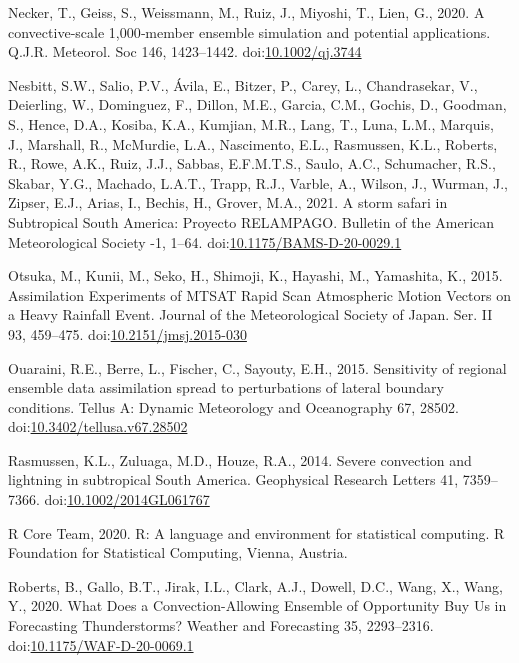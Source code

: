 \documentclass[authoryear,preprint,review,12pt]{elsarticle} %
\begin{document}
\leavevmode\hypertarget{ref-necker2020}{}%
Necker, T., Geiss, S., Weissmann, M., Ruiz, J., Miyoshi, T., Lien, G., 2020. A convective‐scale 1,000‐member ensemble simulation and potential applications. Q.J.R. Meteorol. Soc 146, 1423--1442. doi:\href{https://doi.org/10.1002/qj.3744}{10.1002/qj.3744}

\leavevmode\hypertarget{ref-nesbitt2021}{}%
Nesbitt, S.W., Salio, P.V., Ávila, E., Bitzer, P., Carey, L., Chandrasekar, V., Deierling, W., Dominguez, F., Dillon, M.E., Garcia, C.M., Gochis, D., Goodman, S., Hence, D.A., Kosiba, K.A., Kumjian, M.R., Lang, T., Luna, L.M., Marquis, J., Marshall, R., McMurdie, L.A., Nascimento, E.L., Rasmussen, K.L., Roberts, R., Rowe, A.K., Ruiz, J.J., Sabbas, E.F.M.T.S., Saulo, A.C., Schumacher, R.S., Skabar, Y.G., Machado, L.A.T., Trapp, R.J., Varble, A., Wilson, J., Wurman, J., Zipser, E.J., Arias, I., Bechis, H., Grover, M.A., 2021. A storm safari in Subtropical South America: Proyecto RELAMPAGO. Bulletin of the American Meteorological Society -1, 1--64. doi:\href{https://doi.org/10.1175/BAMS-D-20-0029.1}{10.1175/BAMS-D-20-0029.1}

\leavevmode\hypertarget{ref-otsuka2015}{}%
Otsuka, M., Kunii, M., Seko, H., Shimoji, K., Hayashi, M., Yamashita, K., 2015. Assimilation Experiments of MTSAT Rapid Scan Atmospheric Motion Vectors on a Heavy Rainfall Event. Journal of the Meteorological Society of Japan. Ser. II 93, 459--475. doi:\href{https://doi.org/10.2151/jmsj.2015-030}{10.2151/jmsj.2015-030}

\leavevmode\hypertarget{ref-ouaraini2015}{}%
Ouaraini, R.E., Berre, L., Fischer, C., Sayouty, E.H., 2015. Sensitivity of regional ensemble data assimilation spread to perturbations of lateral boundary conditions. Tellus A: Dynamic Meteorology and Oceanography 67, 28502. doi:\href{https://doi.org/10.3402/tellusa.v67.28502}{10.3402/tellusa.v67.28502}

\leavevmode\hypertarget{ref-rasmussen2014}{}%
Rasmussen, K.L., Zuluaga, M.D., Houze, R.A., 2014. Severe convection and lightning in subtropical South America. Geophysical Research Letters 41, 7359--7366. doi:\href{https://doi.org/10.1002/2014GL061767}{10.1002/2014GL061767}

\leavevmode\hypertarget{ref-rcoreteam2020}{}%
R Core Team, 2020. R: A language and environment for statistical computing. R Foundation for Statistical Computing, Vienna, Austria.

\leavevmode\hypertarget{ref-roberts2020}{}%
Roberts, B., Gallo, B.T., Jirak, I.L., Clark, A.J., Dowell, D.C., Wang, X., Wang, Y., 2020. What Does a Convection-Allowing Ensemble of Opportunity Buy Us in Forecasting Thunderstorms? Weather and Forecasting 35, 2293--2316. doi:\href{https://doi.org/10.1175/WAF-D-20-0069.1}{10.1175/WAF-D-20-0069.1}
\end{document}

